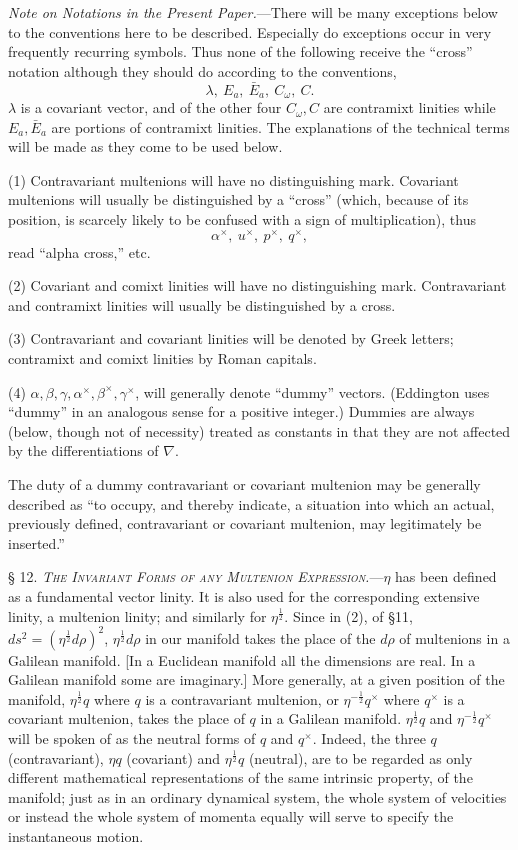 \documentclass[11pt]{article}
\begin{document}
\indent \emph{Note on Notations in the Present Paper.}---There will be many exceptions below to the conventions here to be described. Especially do exceptions occur in very frequently recurring symbols. Thus none of the following receive the ``cross'' notation although they should do according to the conventions,
\[
\lambda,\ E_a,\ \bar E_a,\ C_\omega,\ C.
\]
$\lambda$ is a covariant vector, and of the other four $C_\omega,C$ are contramixt linities while $E_a,\bar E_a$ are portions of contramixt linities. The explanations of the technical terms will be made as they come to be used below.

\indent (1) Contravariant multenions will have no distinguishing mark. Covariant multenions will usually be distinguished by a ``cross'' (which, because of its position, is scarcely likely to be confused with a sign of multiplication), thus
\[
\alpha^\times,\ u^\times,\ p^\times,\ q^\times,
\]
read ``alpha cross,'' etc.

\indent (2) Covariant and comixt linities will have no distinguishing mark. Contravariant and contramixt linities will usually be distinguished by a cross.

\indent (3) Contravariant and covariant linities will be denoted by Greek letters; contramixt and comixt linities by Roman capitals.

\indent (4) $\alpha,\beta,\gamma,\alpha^\times,\beta^\times,\gamma^\times$, will generally denote ``dummy'' vectors. (Eddington uses ``dummy'' in an analogous sense for a positive integer.) Dummies are always (below, though not of necessity) treated as constants in that they are not affected by the differentiations of $\nabla$.

\indent The duty of a dummy contravariant or covariant multenion may be generally described as ``to occupy, and thereby indicate, a situation into which an actual, previously defined, contravariant or covariant multenion, may legitimately be inserted.''

\noindent\textsc{§ 12. \emph{The Invariant Forms of any Multenion Expression.}}---$\eta$ has been defined as a fundamental vector linity. It is also used for the corresponding extensive linity, a multenion linity; and similarly for $\eta^{\frac12}$. Since in (2), of §11, $ds^2=(\eta^{\frac12}d\rho)^2$, $\eta^{\frac12}d\rho$ in our manifold takes the place of the $d\rho$ of multenions in a Galilean manifold. [In a Euclidean manifold all the dimensions are real. In a Galilean manifold some are imaginary.] More generally, at a given position of the manifold, $\eta^{\frac12}q$ where $q$ is a contravariant multenion, or $\eta^{-\frac12}q^\times$ where $q^\times$ is a covariant multenion, takes the place of $q$ in a Galilean manifold. $\eta^{\frac12}q$ and $\eta^{-\frac12}q^\times$ will be spoken of as the neutral forms of $q$ and $q^\times$. Indeed, the three $q$ (contravariant), $\eta q$ (covariant) and $\eta^{\frac12}q$ (neutral), are to be regarded as only different mathematical representations of the same intrinsic property, of the manifold; just as in an ordinary dynamical system, the whole system of velocities or instead the whole system of momenta equally will serve to specify the instantaneous motion.
\end{document}
